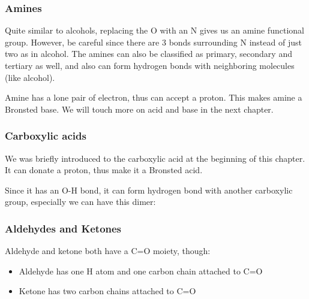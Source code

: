 \documentclass{report}
\begin{document}
		\subsubsection{Amines}
		Quite similar to alcohols, replacing the O with an N gives us an amine functional group. However, be careful since there are 3 bonds surrounding N instead of just two as in alcohol. The amines can also be classified as primary, secondary and tertiary as well, and also can form hydrogen bonds with neighboring molecules (like alcohol).
		\begin{center}
			 \hfill
			 \hfill
		\end{center}
		Amine has a lone pair of electron, thus can accept a proton. This makes amine a Bronsted base. We will touch more on acid and base in the next chapter.
		\begin{center}
			 \hfill
		\end{center}
		
		\subsubsection{Carboxylic acids}
		We was briefly introduced to the carboxylic acid at the beginning of this chapter. It can donate a proton, thus make it a Bronsted acid.
		\begin{center}
			 \hfill
		\end{center}
		
		Since it has an O-H bond, it can form hydrogen bond with another carboxylic group, especially we can have this dimer:
		\begin{center}
		\end{center}
		
		\subsubsection{Aldehydes and Ketones}
		Aldehyde and ketone both have a C=O moiety, though:
		\begin{itemize}
			\item{Aldehyde has one H atom and one carbon chain attached to C=O}
			\item{Ketone has two carbon chains attached to C=O}
		\end{itemize}
		
\end{document}

